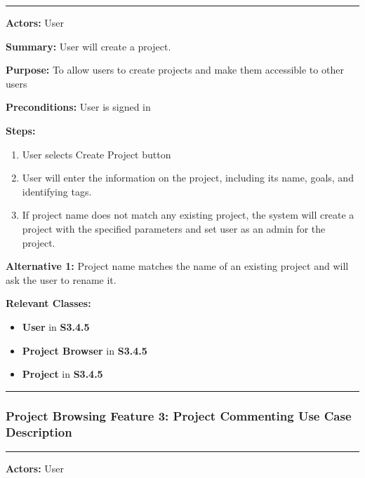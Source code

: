 \documentclass[twoside,letterpaper]{article}
\begin{document}
	\vspace{2pt}
	\hrule
	\vspace{8pt}
	\textbf{Actors:} User \newline
	
	\noindent\textbf{Summary:} User will create a project. \newline
	
	\noindent\textbf{Purpose:} To allow users to create projects and make them accessible to other users \newline
	
	\noindent\textbf{Preconditions:} User is signed in \newline
	
	\noindent\textbf{Steps:} \begin{enumerate}
		\item User selects Create Project button
		\item User will enter the information on the project, including its name, goals, and identifying tags.
		\item If project name does not match any existing project, the system will create a project with the specified parameters and set user as an admin for the project.
	\end{enumerate}
	\noindent\textbf{Alternative 1:} Project name matches the name of an existing project and will ask the user to rename it. \newline
	
	
	\noindent\textbf{Relevant Classes:}
	\begin{itemize}
		\item \textbf{User} in \textbf{S3.4.5}
		\item \textbf{Project Browser} in \textbf{S3.4.5}
		\item \textbf{Project} in \textbf{S3.4.5}
	\end{itemize}
	\vspace{8pt}
	\hrule
	\newpage
	
	
	\subsubsection[Project Browsing Feature 3: Project Commenting Use Case Description]{\rmfamily\bfseries\color{black}
	Project Browsing Feature 3: Project Commenting Use Case Description}
	\hypertarget{RefHeading22059017292}{}
	
	\vspace{2pt}
	\hrule
	\vspace{8pt}
	\textbf{Actors:} User \newline
	
\end{document}
